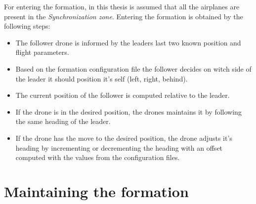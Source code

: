\newpage

For entering the formation, in this thesis is assumed that all the airplanes are
present in the \textit {Synchronization zone}. Entering the formation is obtained
by the following steps:

\begin {itemize}
\item The follower drone is informed by the leaders last two known position and flight
parameters.
\item Based on the formation configuration file the follower decides on witch side
of the leader it should position it's self (left, right, behind).
\item The current position of the follower is computed relative to the leader.
\item If the drone is in the desired position, the drones maintains it 
by following the same heading of the leader.
\item If the drone has the move to the desired position, the drone adjusts it's
heading by incrementing or decrementing the heading with an offset computed
with the values from the configuration files.
\end {itemize}
% 


\section{Maintaining the formation}
\label{sec:formation-maintainig}
